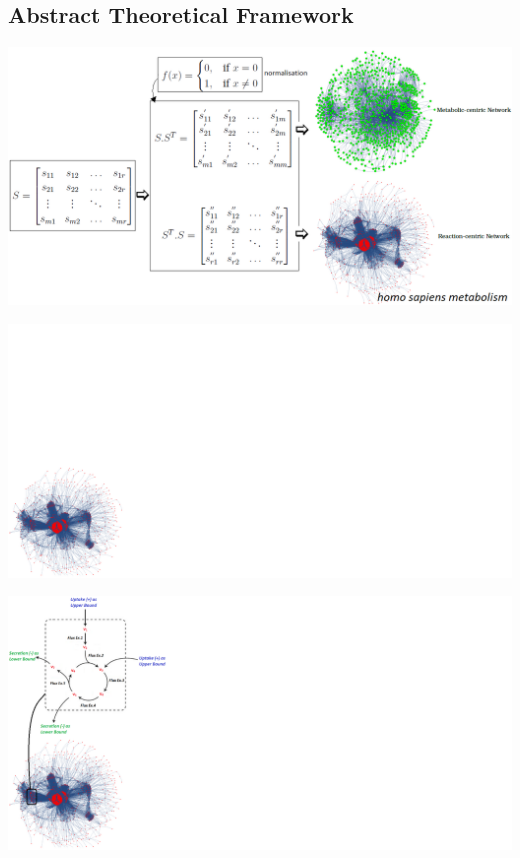 \subsection[Abstract Theoretical Framework]{Abstract Theoretical Framework}
\begin{frame}
	\includegraphics[width=\textwidth]{../tables/gcn_intro.png}
\end{frame}
\begin{frame}
	\includegraphics[width=\textwidth]{../tables/fba_1.png}
\end{frame}
\begin{frame}
	\includegraphics[width=\textwidth]{../tables/fba_2.png}
\end{frame}
